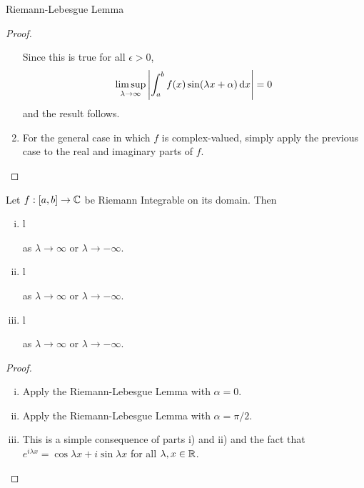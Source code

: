 \begin{section}{Riemann-Lebesgue Lemma}
\begin{proof}
\begin{enumerate}[{Case} 1.]
	Since this is true for all $\epsilon > 0$,
	\begin{displaymath}
	\limsup_{\lambda \rightarrow \infty}
	\left \vert {\int_{a}^{b}{f(x)\sin(\lambda x + \alpha)}\, \mathrm{d}{x}} \right \vert = 0
	\end{displaymath}
	and the result follows.
	\item
	For the general case in which $f$ is complex-valued, simply apply
	the previous case to the real and imaginary parts of $f$.
	\end{enumerate}
\end{proof}


\begin{cor}\label{cor:RLL}
	Let $f:[a,b] \to \mathbb{C}$ be Riemann Integrable on its domain. Then
	\begin{enumerate}[i)]
	\item
	\begin{IEEEeqnarray*}{l}
	 
	\end{IEEEeqnarray*}
	as $\lambda \rightarrow \infty$ or $\lambda \rightarrow -\infty$.
	
	\item
	\begin{IEEEeqnarray*}{l}
	 
	\end{IEEEeqnarray*}
	as $\lambda \rightarrow \infty$ or $\lambda \rightarrow -\infty$.
	
	\item
	\begin{IEEEeqnarray*}{l}
	 
	\end{IEEEeqnarray*}
	as $\lambda \rightarrow \infty$ or $\lambda \rightarrow -\infty$.
	\end{enumerate}
\end{cor}

\begin{proof}
	\begin{enumerate}[i)]
	\item
	Apply the Riemann-Lebesgue Lemma with $\alpha = 0$.
	
	\item
	Apply the Riemann-Lebesgue Lemma with $\alpha = \pi/2$.
	
	\item
	This is a simple consequence of parts i) and ii) and
	the fact that $e^{i\lambda x} = \cos \lambda x + i \sin \lambda x$
	for all $\lambda, x \in \mathbb{R}$.
	\end{enumerate}
\end{proof} 
\end{section}
